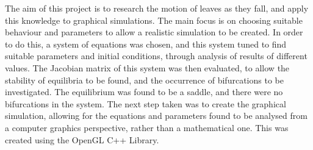 \noindent The aim of this project is to research the motion of leaves as they fall, and apply this knowledge to graphical simulations. The main focus is on choosing suitable behaviour and parameters to allow a realistic simulation to be created. \newline \newline
\noindent In order to do this, a system of equations was chosen, and this system tuned to find suitable parameters and initial conditions, through analysis of results of different values. The Jacobian matrix of this system was then evaluated, to allow the stability of equilibria to be found, and the occurrence of bifurcations to be investigated. The equilibrium was found to be a saddle, and there were no bifurcations in the system. \newline \newline
\noindent The next step taken was to create the graphical simulation, allowing for the equations and parameters found to be analysed from a computer graphics perspective, rather than a mathematical one. This was created using the OpenGL C++ Library. 